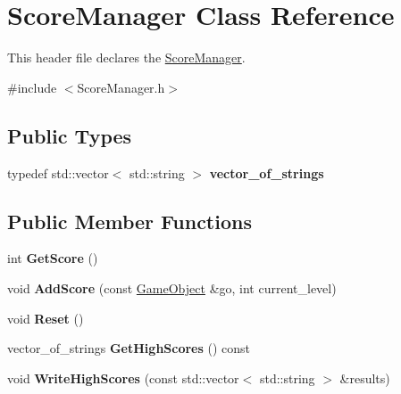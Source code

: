 \hypertarget{class_score_manager}{}\section{Score\+Manager Class Reference}
\label{class_score_manager}


This header file declares the \hyperlink{class_score_manager}{Score\+Manager}.  




{\ttfamily \#include $<$Score\+Manager.\+h$>$}

\subsection*{Public Types}
\begin{DoxyCompactItemize}
\item 
\hypertarget{class_score_manager_a98638d13e649616b30abf546bb9cca28}{}typedef std\+::vector$<$ std\+::string $>$ {\bfseries vector\+\_\+of\+\_\+strings}\label{class_score_manager_a98638d13e649616b30abf546bb9cca28}

\end{DoxyCompactItemize}
\subsection*{Public Member Functions}
\begin{DoxyCompactItemize}
\item 
\hypertarget{class_score_manager_aa8258601779b7261a5329f31b8a90289}{}int {\bfseries Get\+Score} ()\label{class_score_manager_aa8258601779b7261a5329f31b8a90289}

\item 
\hypertarget{class_score_manager_a36e3e78df80f0741cfb6545ab4ee04ef}{}void {\bfseries Add\+Score} (const \hyperlink{class_game_object}{Game\+Object} \&go, int current\+\_\+level)\label{class_score_manager_a36e3e78df80f0741cfb6545ab4ee04ef}

\item 
\hypertarget{class_score_manager_af4a600e8ec22bdbb5bf62d8c2fae2601}{}void {\bfseries Reset} ()\label{class_score_manager_af4a600e8ec22bdbb5bf62d8c2fae2601}

\item 
\hypertarget{class_score_manager_acb62eef0bc732ae6fa1d5d12147bd594}{}vector\+\_\+of\+\_\+strings {\bfseries Get\+High\+Scores} () const \label{class_score_manager_acb62eef0bc732ae6fa1d5d12147bd594}

\item 
\hypertarget{class_score_manager_ad0e31645100ecb55815c4af56ef79abe}{}void {\bfseries Write\+High\+Scores} (const std\+::vector$<$ std\+::string $>$ \&results)\label{class_score_manager_ad0e31645100ecb55815c4af56ef79abe}

\end{DoxyCompactItemize}
